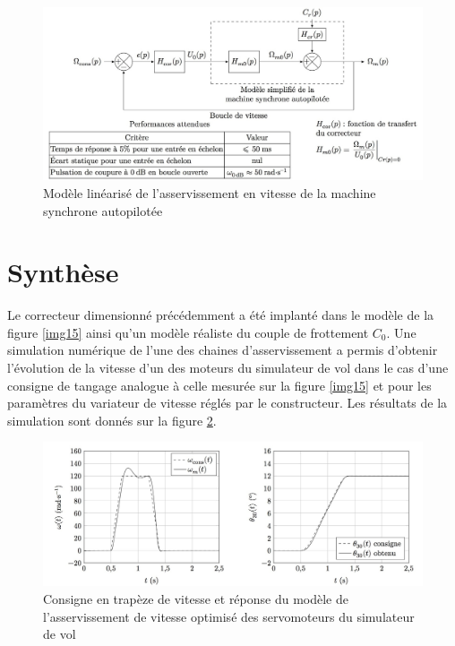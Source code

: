
\begin{figure}[!h]
 \centering\includegraphics[width=0.9\linewidth]{img/figure_16}
 \caption{Modèle linéarisé de l'asservissement en vitesse de la machine synchrone autopilotée}
 \label{img16}
\end{figure}

\section{Synthèse}

Le correcteur dimensionné précédemment a été implanté dans le modèle de la figure \ref{img15} ainsi qu'un modèle
réaliste du couple de frottement $C_0$. Une simulation numérique de l'une des chaines d'asservissement a permis d'obtenir l'évolution de la vitesse d'un des moteurs du simulateur
de vol dans le cas d'une consigne de tangage analogue à celle mesurée sur la figure \ref{img15} et pour les paramètres du variateur de vitesse réglés par le constructeur. Les résultats de la simulation sont donnés sur la figure \ref{img17}.

\begin{figure}[!h]
 \centering\includegraphics[width=0.7\linewidth]{img/figure_17}
 \caption{Consigne en trapèze de vitesse et réponse du modèle de l'asservissement de vitesse optimisé des
servomoteurs du simulateur de vol}
 \label{img17}
\end{figure}


